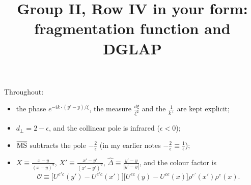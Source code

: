 \documentclass[10pt]{article}
\title{Group II, Row IV in your form: fragmentation function and DGLAP}
\date{}
\numberwithin{equation}{section}
\newcommand{\Dh}{\hat\Delta}
\newcommand{\OO}{\mathcal O}
\begin{document}
\maketitle
\noindent Throughout:
\begin{itemize}
\item the phase $e^{-ik\cdot(y'-y)/\xi}$, the measure $\frac{d\xi}{\xi^2}$ and the $\frac{1}{k^+}$ are kept explicit;
\item $d_\perp=2-\epsilon$, and the collinear pole is infrared ($\epsilon<0$);
\item $\overline{\rm MS}$ subtracts the pole $-\frac{2}{\epsilon}$ (in my earlier notes $-\frac2\epsilon\equiv\frac{1}{\bar\epsilon}$);
\item $X\equiv\frac{x-y}{(x-y)^2}$, $X'\equiv\frac{x'-y'}{(x'-y')^2}$, $\Dh\equiv\frac{y'-y}{|y'-y|}$, and the colour factor is
\begin{equation*}
\OO\equiv\big[U^{e'c}(y')-U^{e'c}(x')\big]\big[U^{ec}(y)-U^{ce}(x)\big]\rho^{e'}(x')\rho^{e}(x).
\end{equation*}
\end{itemize}

\end{document}
